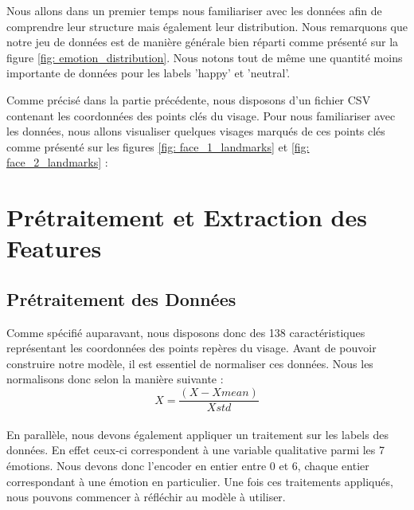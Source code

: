 \documentclass{rapport}
\begin{document}
Nous allons dans un premier temps nous familiariser avec les données afin de comprendre leur structure
mais également leur distribution. Nous remarquons que notre jeu de données est de manière générale bien
réparti comme présenté sur la figure \ref*{fig: emotion_distribution}. Nous notons tout de même une quantité
moins importante de données pour les labels 'happy' et 'neutral'.

Comme précisé dans la partie précédente, nous disposons d'un fichier CSV contenant les coordonnées des points clés du visage. Pour nous familiariser
avec les données, nous allons visualiser quelques visages marqués de ces points clés comme présenté sur les figures
\ref*{fig: face_1_landmarks} et \ref*{fig: face_2_landmarks} :


\section{Prétraitement et Extraction des Features}
\subsection{Prétraitement des Données}
Comme spécifié auparavant, nous disposons donc des 138 caractéristiques représentant les coordonnées des points repères du visage.
Avant de pouvoir construire notre modèle, il est essentiel de normaliser ces données.
Nous les normalisons donc selon la manière suivante \cite{kalapalaFacialExpressionRecognition2020} :\\

\begin{equation}
    X = \frac{(X - Xmean)} {Xstd}
\end{equation}\\

En parallèle, nous devons également appliquer un traitement sur les labels des données.
En effet ceux-ci correspondent à une variable qualitative parmi les 7 émotions.
Nous devons donc l'encoder en entier entre 0 et 6, chaque entier correspondant à une émotion en particulier.
Une fois ces traitements appliqués, nous pouvons commencer à réfléchir au modèle à utiliser.\\
\end{document}
